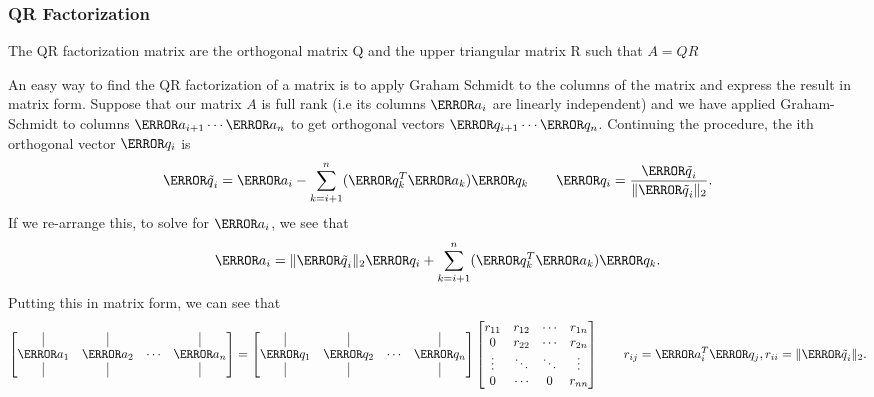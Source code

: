 \subsubsection{QR Factorization}
\begin{definition}
  The QR factorization matrix are the orthogonal matrix Q and the upper triangular matrix R such that $A = QR$
  \label{defn:qr-factorization}
\end{definition}
An easy way to find the QR factorization of a matrix is to apply Graham Schmidt to the columns of the matrix and express the result in matrix form.
Suppose that our matrix $A$ is full rank (i.e its columns $\V{a}_i$ are linearly independent) and we have applied Graham-Schmidt to columns $\V{a}_{i+1}\cdots\V{a}_n$ to get orthogonal vectors $\V{q}_{i+1}\cdots\V{q}_{n}$.
Continuing the procedure, the ith orthogonal vector $\V{q}_i$ is
\[
  \V{\tilde{q}}_i = \V{a}_i - \sum_{k=i+1}^{n} (\V{q}_k^T \V{a}_k)\V{q}_k \qquad \V{q}_i = \frac{\V{\tilde{q}}_i}{\|\V{\tilde{q}}_i\|_2}.
\]
If we re-arrange this, to solve for $\V{a}_i$, we see that
\[
  \V{a}_i = \|\V{\tilde{q}}_i\|_2 \V{q}_i + \sum_{k=i+1}^{n} (\V{q}_k^T \V{a}_k)\V{q}_k.
\]
Putting this in matrix form, we can see that
\[
  \begin{bmatrix}
	\vrule & \vrule & & \vrule \\
	\V{a}_1 & \V{a}_2 & \cdots & \V{a}_{n}\\
	\vrule & \vrule & & \vrule 
  \end{bmatrix} = \begin{bmatrix}
	\vrule & \vrule & & \vrule \\
	\V{q}_1 & \V{q}_2 & \cdots & \V{q}_{n}\\
	\vrule & \vrule & & \vrule 
  \end{bmatrix} \begin{bmatrix}
	r_{11} & r_{12} & \cdots & r_{1n}\\
	0 & r_{22} & \cdots & r_{2n}\\
	\vdots & \ddots & \ddots & \vdots\\
	0 & \cdots & 0 & r_{nn}
  \end{bmatrix} \qquad r_{ij} = \V{a}_i^T\V{q_j}, r_{ii} = \|\V{\tilde{q}}_i\|_2.
\]

